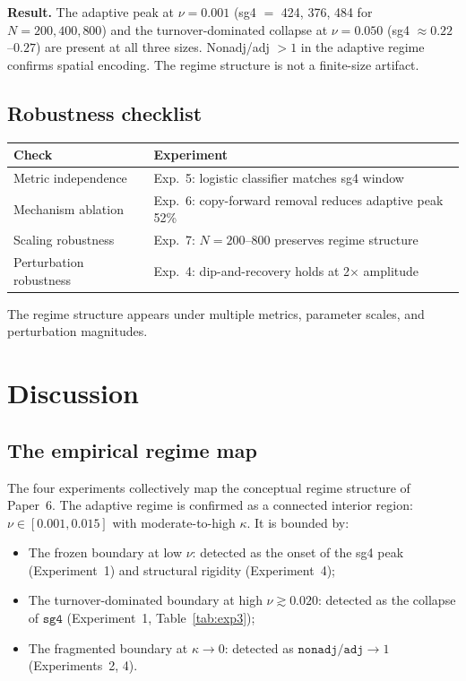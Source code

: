 \documentclass[11pt]{article}
\theoremstyle{remark}
\begin{document}
\textbf{Result.} The adaptive peak at $\nu = 0.001$ (sg4 $=$ 424, 376, 484 for
$N = 200, 400, 800$) and the turnover-dominated collapse at $\nu = 0.050$ (sg4
$\approx 0.22$--$0.27$) are present at all three sizes. Nonadj/adj $> 1$ in the
adaptive regime confirms spatial encoding. The regime structure is not a
finite-size artifact.

\subsection*{Robustness checklist}

\begin{center}
\begin{tabular}{ll}
\toprule
Check & Experiment \\
\midrule
Metric independence   & Exp.~5: logistic classifier matches sg4 window \\
Mechanism ablation    & Exp.~6: copy-forward removal reduces adaptive peak 52\% \\
Scaling robustness    & Exp.~7: $N = 200$--$800$ preserves regime structure \\
Perturbation robustness & Exp.~4: dip-and-recovery holds at 2$\times$ amplitude \\
\bottomrule
\end{tabular}
\end{center}

The regime structure appears under multiple metrics, parameter scales, and
perturbation magnitudes.

\section{Discussion}

\subsection{The empirical regime map}

The four experiments collectively map the conceptual regime structure of Paper~6.
The adaptive regime is confirmed as a connected interior region:
$\nu \in [0.001, 0.015]$ with moderate-to-high $\kappa$. It is bounded by:
\begin{itemize}
  \item The frozen boundary at low $\nu$: detected as the onset of the sg4 peak
    (Experiment~1) and structural rigidity (Experiment~4);
  \item The turnover-dominated boundary at high $\nu \gtrsim 0.020$: detected as the
    collapse of $\mathtt{sg4}$ (Experiment~1, Table~\ref{tab:exp3});
  \item The fragmented boundary at $\kappa \to 0$: detected as $\mathtt{nonadj/adj}
    \to 1$ (Experiments~2, 4).
\end{itemize}
\end{document}
